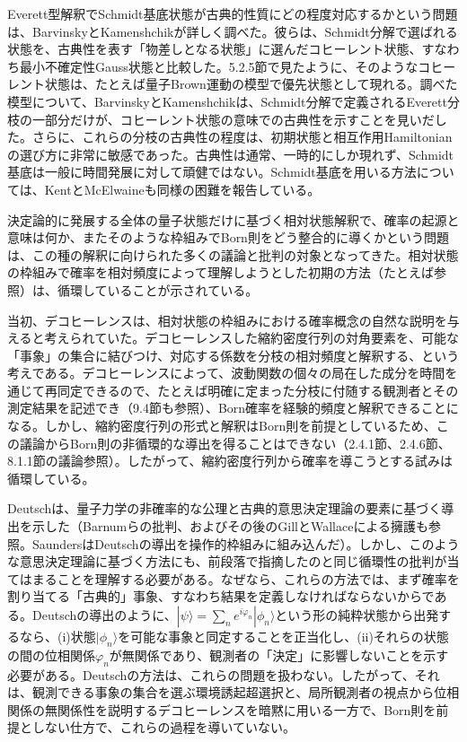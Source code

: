 Everett型解釈でSchmidt基底状態が古典的性質にどの程度対応するかという問題は、BarvinskyとKamenshchik\cite{ref147}が詳しく調べた。彼らは、Schmidt分解で選ばれる状態を、古典性を表す「物差しとなる状態」に選んだコヒーレント状態、すなわち最小不確定性Gauss状態と比較した。5.2.5節で見たように、そのようなコヒーレント状態は、たとえば量子Brown運動の模型で優先状態として現れる。調べた模型について、BarvinskyとKamenshchikは、Schmidt分解で定義されるEverett分枝の一部分だけが、コヒーレント状態の意味での古典性を示すことを見いだした。さらに、これらの分枝の古典性の程度は、初期状態と相互作用Hamiltonianの選び方に非常に敏感であった。古典性は通常、一時的にしか現れず、Schmidt基底は一般に時間発展に対して頑健ではない。Schmidt基底を用いる方法については、KentとMcElwaine\cite{ref148}も同様の困難を報告している。


\hypertarget{srcpage:340}{}\label{srcpage:340}
決定論的に発展する全体の量子状態だけに基づく相対状態解釈で、確率の起源と意味は何か、またそのような枠組みでBorn則をどう整合的に導くかという問題は、この種の解釈に向けられた多くの議論と批判の対象となってきた。相対状態の枠組みで確率を相対頻度によって理解しようとした初期の方法（たとえば\cite{ref140,ref397,ref413,ref414,ref415}参照）は、循環していることが示されている\cite{ref411,ref416,ref417}。

当初、デコヒーレンスは、相対状態の枠組みにおける確率概念の自然な説明を与えると考えられていた。デコヒーレンスした縮約密度行列の対角要素を、可能な「事象」の集合に結びつけ、対応する係数を分枝の相対頻度と解釈する、という考えである\cite{ref104,ref418}。デコヒーレンスによって、波動関数の個々の局在した成分を時間を通じて再同定できるので、たとえば明確に定まった分枝に付随する観測者とその測定結果を記述でき（9.4節も参照）、Born確率を経験的頻度と解釈できることになる。しかし、縮約密度行列の形式と解釈はBorn則を前提としているため、この議論からBorn則の非循環的な導出を得ることはできない（2.4.1節、2.4.6節、8.1.1節の議論参照）。したがって、縮約密度行列から確率を導こうとする試みは循環している\cite{ref016,ref419}。

Deutsch\cite{ref418}は、量子力学の非確率的な公理と古典的意思決定理論の要素に基づく導出を示した（Barnumらの批判\cite{ref420}、およびその後のGill\cite{ref421}とWallace\cite{ref422}による擁護も参照。Saunders\cite{ref423}はDeutschの導出を操作的枠組みに組み込んだ）。しかし、このような意思決定理論に基づく方法にも、前段落で指摘したのと同じ循環性の批判が当てはまることを理解する必要がある。なぜなら、これらの方法では、まず確率を割り当てる「古典的」事象、すなわち結果を定義しなければならないからである。Deutschの導出のように、$|\psi\rangle=\sum_n e^{i\varphi_n}|\phi_n\rangle$という形の純粋状態から出発するなら、(i)状態$|\phi_n\rangle$を可能な事象と同定することを正当化し、(ii)それらの状態の間の位相関係$\varphi_n$が無関係であり、観測者の「決定」に影響しないことを示す必要がある。Deutschの方法は、これらの問題を扱わない。したがって、それは、観測できる事象の集合を選ぶ環境誘起超選択と、局所観測者の視点から位相関係の無関係性を説明するデコヒーレンスを暗黙に用いる一方で、Born則を前提としない仕方で、これらの過程を導いていない。

